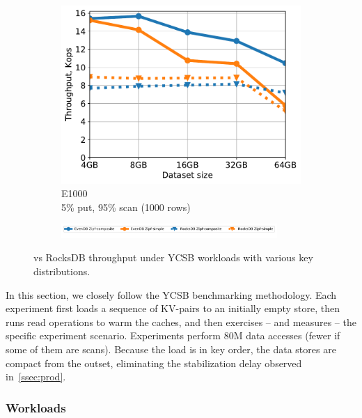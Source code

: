 \begin{figure}[tb]
\begin{subfigure}{0.3\linewidth}
\includegraphics[width=\textwidth]{figs/Workload_E+_line.pdf}
\caption{E1000 \\5\% put, 95\% scan (1000 rows)}
\label{fig:throughput:e1000}
\end{subfigure}
\begin{subfigure}{\linewidth}
\centerline{
\includegraphics[width=0.9\textwidth]{figs/legend.pdf}
\vspace{-5mm}
}
\end{subfigure}
\caption{
{\sys\/ vs RocksDB throughput under YCSB workloads with various key distributions.}
}
\label{fig:throughput}
\end{figure}

In this section, we closely follow the YCSB benchmarking methodology. 
Each experiment first  loads a sequence of KV-pairs to an initially empty store, then  
runs read operations to warm the caches, and then exercises -- and measures --  the specific experiment scenario. 
Experiments perform 80M data accesses (fewer if some of them are scans). Because the load is 
in key order, the data stores are compact from the outset, eliminating the stabilization delay 
observed in~\cref{ssec:prod}.  



\subsubsection{Workloads}

